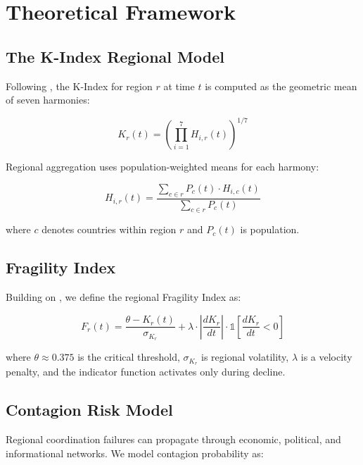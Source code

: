 \documentclass[12pt,a4paper]{article}
\begin{document}
\section{Theoretical Framework}
\label{sec:theory}

\subsection{The K-Index Regional Model}

Following \citet{Paper1}, the K-Index for region $r$ at time $t$ is computed as the geometric mean of seven harmonies:

\begin{equation}
K_r(t) = \left( \prod_{i=1}^{7} H_{i,r}(t) \right)^{1/7}
\end{equation}

Regional aggregation uses population-weighted means for each harmony:

\begin{equation}
H_{i,r}(t) = \frac{\sum_{c \in r} P_c(t) \cdot H_{i,c}(t)}{\sum_{c \in r} P_c(t)}
\end{equation}

where $c$ denotes countries within region $r$ and $P_c(t)$ is population.

\subsection{Fragility Index}

Building on \citet{Paper2, Paper3}, we define the regional Fragility Index as:

\begin{equation}
F_r(t) = \frac{\theta - K_r(t)}{\sigma_{K_r}} + \lambda \cdot \left| \frac{dK_r}{dt} \right| \cdot \mathbb{1}\left[\frac{dK_r}{dt} < 0\right]
\end{equation}

where $\theta \approx 0.375$ is the critical threshold, $\sigma_{K_r}$ is regional volatility, $\lambda$ is a velocity penalty, and the indicator function activates only during decline.

\subsection{Contagion Risk Model}

Regional coordination failures can propagate through economic, political, and informational networks. We model contagion probability as:
\end{document}
